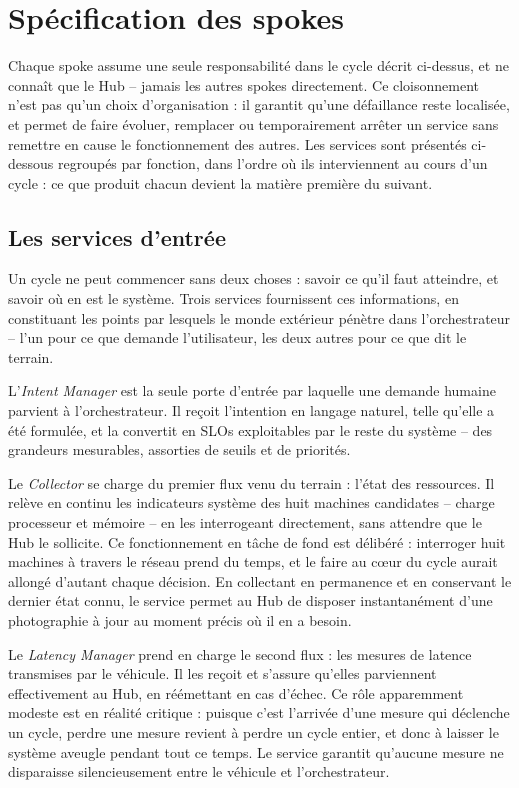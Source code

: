 \section{Spécification des spokes}
\label{sec:spokes}

Chaque spoke assume une seule responsabilité dans le cycle décrit ci-dessus, et ne connaît que le Hub -- jamais les autres spokes directement. Ce cloisonnement n'est pas qu'un choix d'organisation : il garantit qu'une défaillance reste localisée, et permet de faire évoluer, remplacer ou temporairement arrêter un service sans remettre en cause le fonctionnement des autres. Les services sont présentés ci-dessous regroupés par fonction, dans l'ordre où ils interviennent au cours d'un cycle : ce que produit chacun devient la matière première du suivant.

\subsection{Les services d'entrée}
Un cycle ne peut commencer sans deux choses : savoir ce qu'il faut atteindre, et savoir où en est le système. Trois services fournissent ces informations, en constituant les points par lesquels le monde extérieur pénètre dans l'orchestrateur -- l'un pour ce que demande l'utilisateur, les deux autres pour ce que dit le terrain.

L'\emph{Intent Manager} est la seule porte d'entrée par laquelle une demande humaine parvient à l'orchestrateur. Il reçoit l'intention en langage naturel, telle qu'elle a été formulée, et la convertit en SLOs exploitables par le reste du système -- des grandeurs mesurables, assorties de seuils et de priorités.

Le \emph{Collector} se charge du premier flux venu du terrain : l'état des ressources. Il relève en continu les indicateurs système des huit machines candidates -- charge processeur et mémoire -- en les interrogeant directement, sans attendre que le Hub le sollicite. Ce fonctionnement en tâche de fond est délibéré : interroger huit machines à travers le réseau prend du temps, et le faire au cœur du cycle aurait allongé d'autant chaque décision. En collectant en permanence et en conservant le dernier état connu, le service permet au Hub de disposer instantanément d'une photographie à jour au moment précis où il en a besoin.

Le \emph{Latency Manager} prend en charge le second flux : les mesures de latence transmises par le véhicule. Il les reçoit et s'assure qu'elles parviennent effectivement au Hub, en réémettant en cas d'échec. Ce rôle apparemment modeste est en réalité critique : puisque c'est l'arrivée d'une mesure qui déclenche un cycle, perdre une mesure revient à perdre un cycle entier, et donc à laisser le système aveugle pendant tout ce temps. Le service garantit qu'aucune mesure ne disparaisse silencieusement entre le véhicule et l'orchestrateur.

